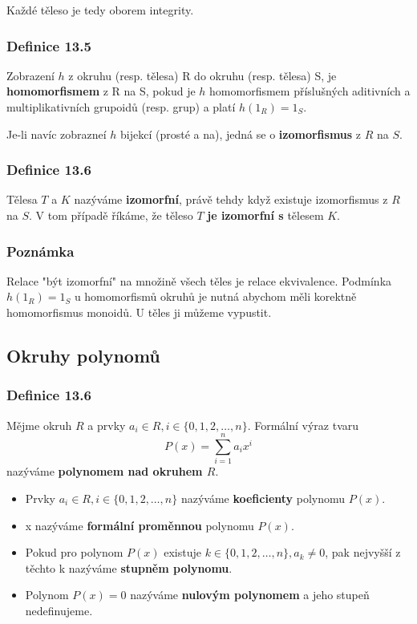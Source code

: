 \documentclass[12pt, letterpaper]{article}
\begin{document}
Každé těleso je tedy oborem integrity.

\subsubsection*{Definice 13.5}
Zobrazení $h$ z okruhu (resp. tělesa) R do okruhu (resp. tělesa) S, je \textbf{homomorfismem} z R na S,
pokud je $h$ homomorfismem příslušných aditivních a multiplikativních grupoidů (resp. grup) a platí $h(1_R) = 1_S$.

Je-li navíc zobrazneí $h$ bijekcí (prosté a na), jedná se o \textbf{izomorfismus} z $R$ na $S$.

\subsubsection*{Definice 13.6}
Tělesa $T$ a $K$ nazýváme \textbf{izomorfní}, právě tehdy když existuje izomorfismus z $R$ na $S$.
V tom případě říkáme, že těleso $T$ \textbf{je izomorfní s} tělesem $K$.

\subsubsection*{Poznámka}
Relace "být izomorfní" na množině všech těles je relace ekvivalence.
Podmínka $h(1_R) = 1_S$ u homomorfismů okruhů je nutná abychom měli korektně homomorfismus monoidů. U těles ji můžeme vypustit.

\subsection{Okruhy polynomů}

\subsubsection*{Definice 13.6}
Mějme okruh $R$ a prvky $a_i \in R, i \in \{0,1,2,\dots,n\}$. Formální výraz tvaru
\[
    P(x) = \sum^n_{i=1}a_ix^i
\]
nazýváme \textbf{polynomem nad okruhem $R$}.

\begin{itemize}
    \item Prvky $a_i \in R, i \in \{0,1,2,\dots,n\}$ nazýváme \textbf{koeficienty} polynomu $P(x)$.
    \item x nazýváme \textbf{formální proměnnou} polynomu $P(x)$.
    \item Pokud pro polynom $P(x)$ existuje $k \in \{0,1,2,\dots,n\}, a_k \neq 0$,
    pak nejvyšší z těchto k nazýváme \textbf{stupněm polynomu}.
    \item Polynom $P(x) = 0$ nazýváme \textbf{nulovým polynomem} a jeho stupeň nedefinujeme.
\end{itemize}
\end{document}
